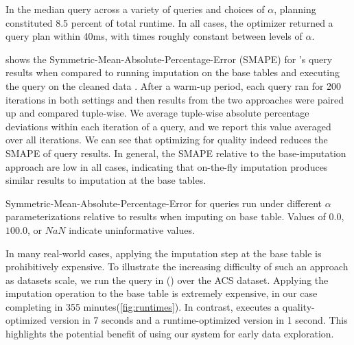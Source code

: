 
In the median query across a variety of queries and choices of $\alpha$, planning
constituted 8.5 percent of total runtime. In all cases, the optimizer
returned a query plan within 40ms, with times roughly constant between levels of $\alpha$.



 shows the Symmetric-Mean-Absolute-Percentage-Error (SMAPE) for \ProjectName{}'s query results when compared to running imputation on the base tables and executing the query on the cleaned data .
After a warm-up period, each query ran for 200 iterations  in both settings and then results from the two approaches were paired up and compared tuple-wise.
We average tuple-wise absolute percentage deviations within each iteration of a query, and we report this value averaged over all iterations.
We can see that optimizing for quality indeed reduces the SMAPE of query results.
In general, the SMAPE relative to the base-imputation approach are low in all cases, indicating that on-the-fly imputation produces similar results to imputation at the base tables.

\begin{table}
\centering

\caption{Symmetric-Mean-Absolute-Percentage-Error for queries run under different $\alpha$
    parameterizations relative to results when imputing on base table. Values of $0.0$,
    $100.0$, or $NaN$ indicate uninformative values.} %
\label{table:smape}
\end{table}

In many real-world cases, applying the imputation step at the base table is prohibitively
expensive.
To illustrate the increasing difficulty of such an approach as datasets scale, we run the
query in () over the ACS dataset.
Applying the imputation operation to the base table is extremely expensive, in our case
completing in 355 minutes(\ref{fig:runtimes}). In contrast, \ProjectName{} executes a quality-optimized version
in 7 seconds and a runtime-optimized version in 1 second. This highlights the potential
benefit of using our system for early data exploration.

